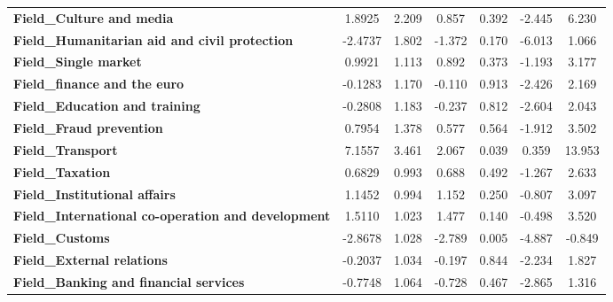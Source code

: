 \documentclass[ 11pt]{article}
\begin{document}
\begin{center}
\begin{longtable}{lcccccc}
\textbf{Field\_Culture and media}                          &       1.8925  &        2.209     &     0.857  &         0.392        &       -2.445    &        6.230     \\
\textbf{Field\_Humanitarian aid and civil protection}      &      -2.4737  &        1.802     &    -1.372  &         0.170        &       -6.013    &        1.066     \\
\textbf{Field\_Single market}                              &       0.9921  &        1.113     &     0.892  &         0.373        &       -1.193    &        3.177     \\
\textbf{Field\_finance and the euro}                       &      -0.1283  &        1.170     &    -0.110  &         0.913        &       -2.426    &        2.169     \\
\textbf{Field\_Education and training}                     &      -0.2808  &        1.183     &    -0.237  &         0.812        &       -2.604    &        2.043     \\
\textbf{Field\_Fraud prevention}                           &       0.7954  &        1.378     &     0.577  &         0.564        &       -1.912    &        3.502     \\
\textbf{Field\_Transport}                                  &       7.1557  &        3.461     &     2.067  &         0.039        &        0.359    &       13.953     \\
\textbf{Field\_Taxation}                                   &       0.6829  &        0.993     &     0.688  &         0.492        &       -1.267    &        2.633     \\
\textbf{Field\_Institutional affairs}                      &       1.1452  &        0.994     &     1.152  &         0.250        &       -0.807    &        3.097     \\
\textbf{Field\_International co-operation and development} &       1.5110  &        1.023     &     1.477  &         0.140        &       -0.498    &        3.520     \\
\textbf{Field\_Customs}                                    &      -2.8678  &        1.028     &    -2.789  &         0.005        &       -4.887    &       -0.849     \\
\textbf{Field\_External relations}                         &      -0.2037  &        1.034     &    -0.197  &         0.844        &       -2.234    &        1.827     \\
\textbf{Field\_Banking and financial services}             &      -0.7748  &        1.064     &    -0.728  &         0.467        &       -2.865    &        1.316     \\

\end{longtable}
\end{center}
\end{document}
